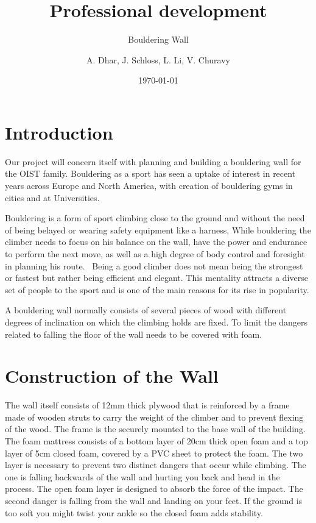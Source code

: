 \documentclass{scrartcl}
\date{\today}
\title{Professional development}
\subtitle{Bouldering Wall}
\author{A. Dhar, J. Schloss, L. Li, V. Churavy}
\begin{document}
\maketitle
\section{Introduction}
Our project will concern itself with planning and building a bouldering wall for the OIST family.
Bouldering as a sport has seen a uptake of interest in recent years across Europe and North America, with creation of bouldering gyms in cities and at Universities. 

Bouldering is a form of sport climbing close to the ground and without the need of being belayed or wearing safety equipment like a harness, While bouldering the climber needs to focus on his balance on the wall, have the power and endurance to perform the next move, as well as a high degree of body control and foresight in planning his route.  Being a good climber does not mean being the strongest or fastest but rather being efficient and elegant. This mentality attracts a diverse set of people to the sport and is one of the main reasons for its rise in popularity.

A bouldering wall normally consists of several pieces of wood with different degrees of inclination on which the climbing holds are fixed. To limit the dangers related to falling the floor of the wall needs to be covered with foam.

\section{Construction of the Wall}
The wall itself consists of 12mm thick plywood that is reinforced by a frame made of wooden struts to carry the weight of the climber and to prevent flexing of the wood. The frame is the securely mounted to the base wall of the building. 
The foam mattress consists of a bottom layer of 20cm thick open foam and a top layer of 5cm closed foam, covered by a PVC sheet to protect the foam.
The two layer is necessary to prevent two distinct dangers that occur while climbing. The one is falling backwards of the wall and hurting you back and head in the process. The open foam layer is designed to absorb the force of the impact. The second danger is falling from the wall and landing on your feet. If the ground is too soft you might twist your ankle so the closed foam adds stability.

\end{document}
